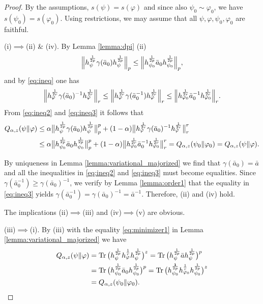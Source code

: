 \documentclass[12pt]{article}
\theoremstyle{definition}
\theoremstyle{remark}
\numberwithin{equation}{section}
\def \Tr{\mathrm{Tr}\,}
\def\ffi{\varphi}
\def\1{\mathbf{1}}
\begin{document}
\begin{proof}
By the assumptions, $s(\psi)=s(\ffi)$ and since also $\psi_0\sim \ffi_0$, we have
$s(\psi_0)=s(\ffi_0)$. Using restrictions, we may assume that all
$\psi,\ffi,\psi_0,\ffi_0$ are faithful.


(i)$\implies$(ii) \& (iv).\enspace
By Lemma \ref{lemma:dpi} (ii) 
\begin{align}
\Big\|h_\psi^{1\over2p}\gamma(\bar a_0)h_\psi^{1\over2p}\Big\|_{p}
\le\Big\|h_{\psi_0}^{1\over2p}\bar a_0h_{\psi_0}^{1\over2p}\Big\|_{p},
\label{eq:ineq2}
\end{align}
and by \eqref{eq:ineq} one has
\begin{align}
\Big\|h_\ffi^{1\over2r}\gamma(\bar a_0)^{-1}h_\ffi^{1\over2r}\Big\|_{r}
\le\Big\|h_\ffi^{1\over2r}\gamma(\bar a_0^{-1})h_\ffi^{1\over2r}\Big\|_{r}
\le\Big\|h_{\ffi_0}^{1\over2r}\bar
a_0^{-1}h_{\ffi_0}^{1\over2r}\Big\|_{r}. \label{eq:ineq3}
\end{align}
From \eqref{eq:ineq2} and \eqref{eq:ineq3} it follows that
\begin{align*}
Q_{\alpha,z}(\psi\|\ffi)&\le \alpha\big\|h_\psi^{1\over2p}\gamma(\bar
a_0)h_\psi^{1\over2p}\big\|^p_{p}
+(1-\alpha)\big\|h_\ffi^{1\over2r}\gamma(\bar a_0)^{-1}h_\ffi^{1\over2r}\big\|^r_{r} \\
&\le\alpha\big\|h_{\psi_0}^{1\over2p}\bar a_0h_{\psi_0}^{1\over2p}\big\|^p_{p}
+(1-\alpha)\big\|h_{\ffi_0}^{1\over2r}\bar a_0^{-1}h_{\ffi_0}^{1\over2r}\big\|^r_{r} =Q_{\alpha,z}(\psi_0\|\ffi_0)=Q_{\alpha,z}(\psi\|\ffi).
\end{align*}


By uniqueness in Lemma \ref{lemma:variational_majorized} we find that $\gamma(\bar
a_0)=\bar a$ and all the inequalities in \eqref{eq:ineq2} and \eqref{eq:ineq3} must
become equalities. Since $\gamma(\bar a_0^{-1})\ge\gamma(\bar a_0)^{-1}$, we  verify by
Lemma \ref{lemma:order1} that the equality in
\eqref{eq:ineq3} yields $\gamma(\bar a_0^{-1})=\gamma(\bar a_0)^{-1}=\bar a^{-1}$. Therefore,
(ii) and (iv) hold.

The implications (ii)$\implies$(iii) and (iv)$\implies$(v) are obvious.

(iii)$\implies$(i).\enspace
By (iii) with the equality \eqref{eq:minimizer1} in Lemma \ref{lemma:variational_majorized} we have
\begin{align*}
Q_{\alpha,z}(\psi\|\ffi)
&=\Tr\bigl(h_\psi^{1\over2p}h_\ffi^{1\over r}h_\psi^{1\over2p}\bigr)^z
=\Tr\bigl(h_\psi^{1\over2p}\bar ah_\psi^{1\over2p}\bigr)^{p} \\
&=\Tr\bigl(h_{\psi_0}^{1\over2p}\bar a_0h_{\psi_0}^{1\over2p}\bigr)^{p}
=\Tr\bigl(h_{\psi_0}^{\1\over2p}h_{\ffi_0}^{1\over r}h_{\psi_0}^{1\over2p}\bigr)^z \\
&=Q_{\alpha,z}(\psi_0\|\ffi_0).
\end{align*}


\end{proof}
\end{document}
